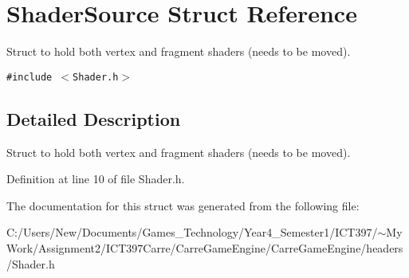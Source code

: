 \hypertarget{struct_shader_source}{
\section{ShaderSource Struct Reference}
\label{struct_shader_source}
}
Struct to hold both vertex and fragment shaders (needs to be moved).  


{\tt \#include $<$Shader.h$>$}



\subsection{Detailed Description}
Struct to hold both vertex and fragment shaders (needs to be moved). 

Definition at line 10 of file Shader.h.

The documentation for this struct was generated from the following file:\begin{CompactItemize}
\item 
C:/Users/New/Documents/Games\_\-Technology/Year4\_\-Semester1/ICT397/$\sim$My Work/Assignment2/ICT397Carre/CarreGameEngine/CarreGameEngine/headers/Shader.h\end{CompactItemize}
